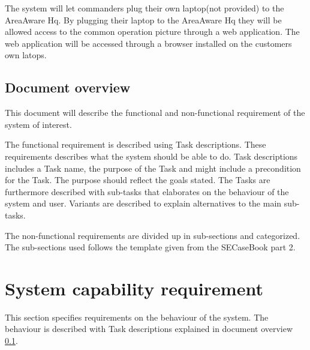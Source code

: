The system will let commanders plug their own laptop(not provided) to the AreaAware Hq. By plugging their laptop to the AreaAware Hq they will be allowed access to the common operation picture through a web application. The web application will be accessed through a browser installed on the customers own latops.

\subsection{Document overview}
\label{sec_documentOverview}
This document will describe the functional and non-functional requirement of the system of interest. 

The functional requirement is described using Task descriptions. These requirements describes what the system should be able to do. Task descriptions includes a Task name, the purpose of the Task and might include a precondition for the Task. The purpose should reflect the goals stated. The Tasks are furthermore described with sub-tasks that elaborates on the behaviour of the system and user.  Variants are described to explain alternatives to the main sub-tasks. \citep{taskDescription}

The non-functional requirements are divided up in sub-sections and categorized. The sub-sections used follows the template given from the SECaseBook part 2. \citep{casebook}



\newpage
\section{System capability requirement}
This section specifies requirements on the behaviour of the system. The behaviour is described with Task descriptions explained in document overview \ref{sec_documentOverview}.

